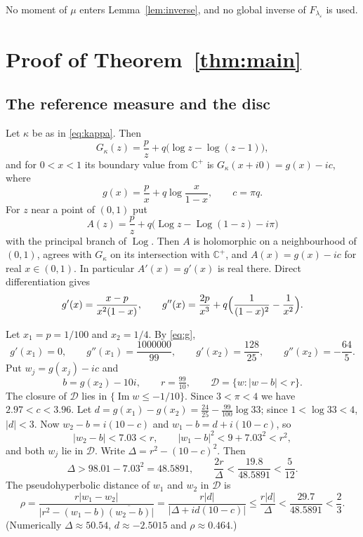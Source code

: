 \documentclass[11pt]{amsart}
\theoremstyle{definition}
\theoremstyle{remark}
\numberwithin{equation}{section}
\newcommand{\Hp}{\mathbb{C}^+}
\newcommand{\eps}{\varepsilon}
\DeclareMathOperator{\Log}{Log}
\begin{document}
No moment of $\mu$ enters Lemma~\ref{lem:inverse}, and no global inverse of $F_{\lambda_\eps}$ is used.

\section{Proof of Theorem~\ref{thm:main}}\label{sec:proof}

\subsection{The reference measure and the disc}
Let $\kappa$ be as in \eqref{eq:kappa}. Then
\[
G_\kappa(z)=\frac pz+q\bigl(\log z-\log(z-1)\bigr),
\]
and for $0<x<1$ its boundary value from $\Hp$ is $G_\kappa(x+i0)=g(x)-ic$, where
\[
g(x)=\frac px+q\log\frac{x}{1-x},\qquad c=\pi q .
\]
For $z$ near a point of $(0,1)$ put
\[
A(z)=\frac pz+q\bigl(\Log z-\Log(1-z)-i\pi\bigr)
\]
with the principal branch of $\Log$. Then $A$ is holomorphic on a neighbourhood of $(0,1)$, agrees with $G_\kappa$ on its intersection with $\Hp$, and $A(x)=g(x)-ic$ for real $x\in(0,1)$. In particular $A'(x)=g'(x)$ is real there. Direct differentiation gives
\begin{equation}\label{eq:g}
g'(x)=\frac{x-p}{x^2(1-x)},\qquad g''(x)=\frac{2p}{x^3}+q\Bigl(\frac1{(1-x)^2}-\frac1{x^2}\Bigr).
\end{equation}

Let $x_1=p=1/100$ and $x_2=1/4$. By \eqref{eq:g},
\begin{equation}\label{eq:gvals}
g'(x_1)=0,\qquad g''(x_1)=\frac{1000000}{99},\qquad g'(x_2)=\frac{128}{25},\qquad g''(x_2)=-\frac{64}{5}.
\end{equation}
Put $w_j=g(x_j)-ic$ and
\[
b=g(x_2)-10i,\qquad r=\tfrac{99}{10},\qquad \mathcal D=\{w:|w-b|<r\}.
\]
The closure of $\mathcal D$ lies in $\{\operatorname{Im}w\le-1/10\}$. Since $3<\pi<4$ we have $2.97<c<3.96$. Let $d=g(x_1)-g(x_2)=\frac{24}{25}-\frac{99}{100}\log33$; since $1<\log 33<4$, $|d|<3$. Now $w_2-b=i(10-c)$ and $w_1-b=d+i(10-c)$, so
\[
|w_2-b|<7.03<r,\qquad |w_1-b|^2<9+7.03^2<r^2,
\]
and both $w_j$ lie in $\mathcal D$. Write $\Delta=r^2-(10-c)^2$. Then
\[
\Delta>98.01-7.03^2=48.5891,\qquad \frac{2r}{\Delta}<\frac{19.8}{48.5891}<\frac5{12}.
\]
The pseudohyperbolic distance of $w_1$ and $w_2$ in $\mathcal D$ is
\[
\rho=\frac{r|w_1-w_2|}{\bigl|r^2-(w_1-b)\overline{(w_2-b)}\bigr|}=\frac{r|d|}{|\Delta+id(10-c)|}\le\frac{r|d|}{\Delta}<\frac{29.7}{48.5891}<\frac23 .
\]
(Numerically $\Delta\approx50.54$, $d\approx-2.5015$ and $\rho\approx0.464$.)
\end{document}
